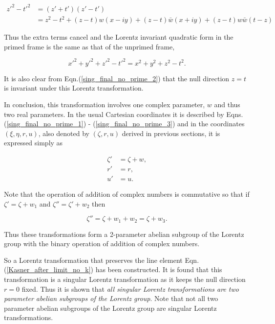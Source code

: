 \begin{align*}
{z'}^2 - {t'}^2 & = (z' + t')(z' - t') \\
& = z^2 - t^2 + (z - t)w(x-iy) + (z-t)\bar{w}(x+iy) + (z -t)w\bar{w}(t-z)
\end{align*}

\noindent Thus the extra terms cancel and the Lorentz invariant quadratic form in the primed frame is the same as that of the unprimed frame,

\begin{equation*} 
{x'}^2 + {y'}^2 + {z'}^2 - {t'}^2 = {x}^2 + {y}^2 + {z}^2 - {t}^2.
\end{equation*} 

\noindent It is also clear from Eqn.(\ref{sing_final_no_prime_2}) that the null direction $z = t$ is invariant under this Lorentz transformation.

In conclusion, this transformation involves one complex parameter, $w$ and thus two real parameters. In the usual Cartesian coordinates it is described by Eqns.(\ref{sing_final_no_prime_1}) - (\ref{sing_final_no_prime_3}) and in the coordinates $(\xi, \eta, r, u)$, also denoted by $(\zeta, r,u)$ derived in previous sections, it is expressed simply as

\begin{align*}
\zeta' & = \zeta + w, \\
r' & = r, \\
u' & = u.
\end{align*}

Note that the operation of addition of complex numbers is commutative so that if $\zeta' = \zeta + w_1$ and $\zeta'' = \zeta' + w_2$ then

\begin{equation*} 
\zeta'' = \zeta + w_1 + w_2 = \zeta + w_3.
\end{equation*} 
 
\noindent Thus these transformations form a 2-parameter abelian subgroup of the Lorentz group with the binary operation of addition of complex numbers.

So a Lorentz transformation that preserves the line element Eqn.(\ref{Kasner_after_limit_no_k}) has been constructed. It is found that this transformation is a singular Lorentz transformation as it keeps the null direction $r=0$ fixed. Thus it is shown that \textit{all singular Lorentz transformations are two parameter abelian subgroups of the Lorentz group}. Note that not all two parameter abelian subgroups of the Lorentz group are singular Lorentz transformations.  






